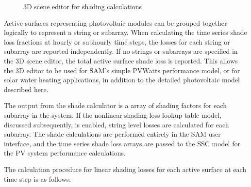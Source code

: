\documentclass[12pt,letterpaper]{article}
\begin{document}
\begin{figure}
\begin{center}
\caption{3D scene editor for shading calculations}
\label{fig:3dscene}
\end{center}
\end{figure}

Active surfaces representing photovoltaic modules can be grouped together logically to represent a string or subarray.  When calculating the time series shade loss fractions at hourly or subhourly time steps, the losses for each string or subarray are reported independently.  If no strings or subarrays are specified in the 3D scene editor, the total active surface shade loss is reported.  This allows the 3D editor to be used for SAM's simple PVWatts performance model, or for solar water heating applications, in addition to the detailed photovoltaic model described here.

The output from the shade calculator is a array of shading factors for each subarray in the system.  If the nonlinear shading loss lookup table model, discussed subsequently, is enabled, string level losses are calculated for each subarray.  The shade calculations are performed entirely in the SAM user interface, and the time series shade loss arrays are passed to the SSC model for the PV system performance calculations.

The calculation procedure for linear shading losses for each active surface at each time step is as follows:
\end{document}
